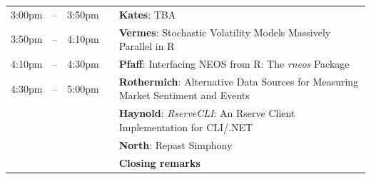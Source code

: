 \documentclass[11pt]{article}
\begin{document}
\begin{tabular}{rlrlp{5in}}
   3:00pm & -- & 3:50pm  &   & \textbf{\color{KeynoteTalk} Kates}: \small{TBA} \\
   3:50pm & -- & 4:10pm  &   & \textbf{\color{Talk} Vermes}: \small{Stochastic Volatility Models Massively Parallel in R} \\
   4:10pm & -- & 4:30pm  &   & \textbf{\color{Talk} Pfaff}: \small{Interfacing NEOS from R: The \emph{rneos} Package} \\
   4:30pm & -- & 5:00pm  &   & \textbf{\color{LightningTalk} Rothermich}: \small{Alternative Data Sources for Measuring Market Sentiment and Events} \\
          &    &        &    & \textbf{\color{LightningTalk} Haynold}: \small{\emph{RserveCLI}: An Rserve Client Implementation for CLI/.NET} \\
          &    &         &   & \textbf{\color{LightningTalk} North}: \small{Repast Simphony} \\
          &    &         &   & \textbf{\color{Breaks} Closing remarks} \\
\end{tabular}
\end{document}
